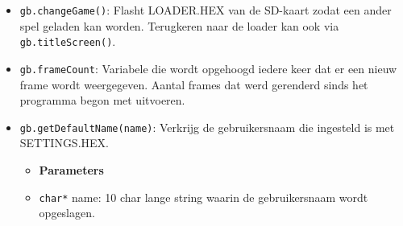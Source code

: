 \documentclass[a4paper,titlepage,12pt]{article}
\begin{document}
\begin{itemize}
		\item \texttt{gb.changeGame()}:
		Flasht LOADER.HEX van de SD-kaart zodat een ander spel geladen kan worden. Terugkeren naar de loader kan ook via \texttt{gb.titleScreen()}.
		
		\item \texttt{gb.frameCount}:
		Variabele die wordt opgehoogd iedere keer dat er een nieuw frame wordt weergegeven. Aantal frames dat werd gerenderd sinds het programma begon met uitvoeren.
		
		\item \texttt{gb.getDefaultName(name)}:
		Verkrijg de gebruikersnaam die ingesteld is met SETTINGS.HEX.
		\begin{itemize}
			\item [] \textbf{Parameters}
			\item \texttt{char*} name: 10 char lange string waarin de gebruikersnaam wordt opgeslagen.
		\end{itemize}
	\end{itemize}
	
\end{document}
